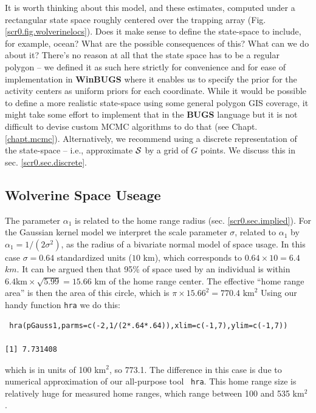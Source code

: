 {It is worth thinking about this model, and these estimates, computed
under a rectangular state space roughly centered over the trapping
array (Fig. \ref{scr0.fig.wolverinelocs}).  Does it make sense to
define the state-space to include, for example, ocean? What are the
possible consequences of this? What can we do about it?  There's no
reason at all that the state space has to be a regular polygon -- we
defined it as such here strictly for convenience and for ease of
implementation in {\bf WinBUGS} where it enables us to specify the
prior for the activity centers as uniform priors for each coordinate.
While it would be possible to define a more realistic state-space
using some general polygon GIS coverage, it might take some effort to
implement that in the {\bf BUGS} language but it is not difficult to
devise custom MCMC algorithms to do that (see
Chapt. \ref{chapt.mcmc}).  Alternatively, we recommend using a
discrete representation of the state-space -- i.e., approximate ${\cal
  S}$ by a grid of $G$ points. We discuss this in sec.
\ref{scr0.sec.discrete}.

\subsection{Wolverine Space Useage}

The parameter $\alpha_{1}$ is related to the home range radius
(sec. \ref{scr0.sec.implied}).  For the Gaussian kernel model we
interpret the scale parameter $\sigma$, related to $\alpha_1$ by
$\alpha_1 = 1/(2\sigma^2)$, as the radius of a bivariate normal model
of space usage.  In this case $\sigma = 0.64$ standardized units ($10$
km), which corresponds to $0.64 \times 10 = 6.4$ $km$.  It can be
argued then that 95\% of space used by an individual is within $6.4
\mbox{km} \times \sqrt{5.99} = 15.66$ km of the home range center. The
effective ``home range area'' is then the area of this circle, which is
$\pi \times 15.66^2 = 770.4$ $\mbox{km}^{2}$
Using our handy function \mbox{\tt hra} we do this:
\begin{verbatim}
 hra(pGauss1,parms=c(-2,1/(2*.64*.64)),xlim=c(-1,7),ylim=c(-1,7))

[1] 7.731408
\end{verbatim}
which is in units of 100 km$^2$, so 773.1. The difference in this case
is due to numerical approximation of our all-purpose tool \mbox{\tt
  hra}. This home range size is 
relatively huge for measured home ranges, which range between
100 and 535 km$^2$ \citep{whitman_etal:1986}.

}
